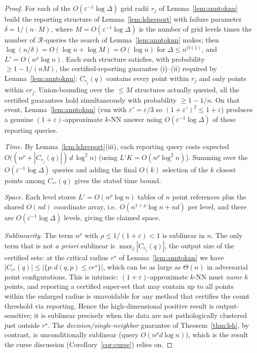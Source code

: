 \documentclass{amsart}
\newcommand{\eps}{\varepsilon}
\begin{document}
\begin{proof}
For each of the $O(\eps^{-1}\log\Delta)$ grid radii $r_j$ of Lemma~\ref{lem:anntoknn}
build the reporting structure of Lemma~\ref{lem:lshreport} with failure parameter
$\delta=1/(n\cdot M)$, where $M=O(\eps^{-1}\log\Delta)$ is the number of grid levels
times the number of $\mathcal R$-queries the search of Lemma~\ref{lem:anntoknn} makes;
then $\log(n/\delta)=O(\log n+\log M)=O(\log n)$ for $\Delta\le n^{O(1)}$, and
$L'=O(n^{\rho}\log n)$.  Each such structure satisfies, with probability
$\ge 1-1/(nM)$, the certified-reporting guarantee (i)--(ii) required by
Lemma~\ref{lem:anntoknn}: $C_{r_j}(q)$ contains every point within $r_j$ and only
points within $cr_j$.  Union-bounding over the $\le M$ structures actually queried, all
the certified guarantees hold simultaneously with probability $\ge 1-1/n$.  On that
event, Lemma~\ref{lem:anntoknn} (run with $\eps'=\eps/3$ so $(1+\eps')^2\le 1+\eps$)
produces a genuine $(1+\eps)$-approximate $k$-NN answer using $O(\eps^{-1}\log\Delta)$
of these reporting queries.

\emph{Time.}  By Lemma~\ref{lem:lshreport}(iii), each reporting query costs expected
$O\big((n^{\rho}+|C_{r_j}(q)|)\,d\,\log^2 n\big)$ (using $L'K=O(n^{\rho}\log^2 n)$).
Summing over the $O(\eps^{-1}\log\Delta)$ queries and adding the final $O(k)$ selection
of the $k$ closest points among $C_{r^\star}(q)$ gives the stated time bound.

\emph{Space.}  Each level stores $L'=O(n^{\rho}\log n)$ tables of $n$ point references
plus the shared $O(nd)$ coordinate array, i.e.\ $O(n^{1+\rho}\log n+nd)$ per level, and
there are $O(\eps^{-1}\log\Delta)$ levels, giving the claimed space.

\emph{Sublinearity.}  The term $n^{\rho}$ with $\rho\le 1/(1+\eps)<1$ is sublinear in
$n$.  The only term that is not \emph{a priori} sublinear is $\max_j|C_{r_j}(q)|$, the
output size of the certified sets: at the critical radius $r^\star$ of
Lemma~\ref{lem:anntoknn} we have $|C_{r^\star}(q)|\le |\{p:d(q,p)\le cr^\star\}|$, which
can be as large as $\Theta(n)$ in adversarial point configurations.  This is intrinsic:
$(1+\eps)$-approximate $k$-NN must \emph{name} $k$ points, and reporting a certified
super-set that may contain up to all points within the enlarged radius is unavoidable
for any method that certifies the count threshold via reporting.  Hence the
high-dimensional positive result is output-sensitive; it is sublinear precisely when
the data are not pathologically clustered just outside $r^\star$.  The
\emph{decision/single-neighbor} guarantee of Theorem~\ref{thm:lsh}, by contrast, is
unconditionally sublinear (query $O(n^{\rho}d\log n)$), which is the result the curse
discussion (Corollary~\ref{cor:curse}) relies on.
\end{proof}
\end{document}
